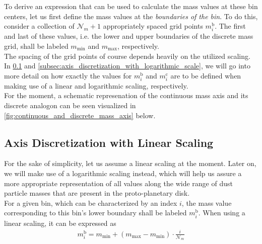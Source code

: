     To derive an expression that can be used to calculate the mass values at these bin centers, 
    let us first define the mass values at the \textit{boundaries of the bin}. To do this,
    consider a collection of $\mathcal N_m+1$ appropriately spaced grid points $m_i^\text{b}$. 
    The first and last of these values, i.e. the lower and upper boundaries of the discrete mass 
    grid, shall be labeled $m_\text{min}$ and $m_\text{max}$, respectively. \\

    The spacing of the grid points of course depends heavily on the utilized scaling. In
    \cref{subsec:axis_discretization_with_linear_scale} and
    \cref{subsec:axis_discretization_with_logarithmic_scale}, we will go into more detail on how 
    exactly the values for $m_i^\text{b}$ and $m_i^\text{c}$ are to be defined when making use of 
    a linear and logarithmic scaling, respectively. \\

    For the moment, a schematic represenation of the continuous mass axis and its discrete analogon
    can be seen visualized in \cref{fig:continuous_and_discrete_mass_axis} below.

    

    \subsection{Axis Discretization with Linear Scaling}
    \label{subsec:axis_discretization_with_linear_scale}

        For the sake of simplicity, let us assume a linear scaling at the moment. Later on, we 
        will make use of a logarithmic scaling instead, which will help us assure a more 
        appropriate representation of all values along the wide range of dust particle masses 
        that are present in the proto-planetary disk. \\
    
        For a given bin, which can be characterized by an index $i$, the mass value corresponding 
        to this bin's lower boundary shall be labeled $m_i^\text{b}$. When using a linear scaling,
        it can be expressed as
        \begin{align}
          m_i^\text{b}=m_\text{min}+(m_\text{max}-m_\text{min})\cdot\frac{i}{\mathcal N_m}
        \end{align}

